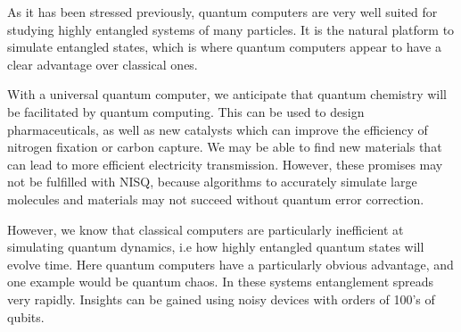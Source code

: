 As it has been stressed previously, quantum computers are very well suited for studying highly entangled systems of many particles. It is the natural platform to simulate entangled states, which is where quantum computers appear to have a clear advantage over classical ones.
 
With a universal quantum computer, we anticipate that quantum chemistry will be facilitated by quantum computing. This can be used to design pharmaceuticals, as well as new catalysts which can improve the efficiency of nitrogen fixation or carbon capture. We may be able to find new materials that can lead to more efficient electricity transmission. However, these promises may not be fulfilled with NISQ, because algorithms to accurately simulate large molecules and materials may not succeed without quantum error correction.

However, we know that classical computers are particularly inefficient at simulating quantum dynamics, i.e how highly entangled quantum states will evolve time. Here quantum computers have a particularly obvious advantage, and one example would be quantum chaos. In these systems entanglement spreads very rapidly. Insights can be gained using noisy devices with orders of 100's of qubits.

